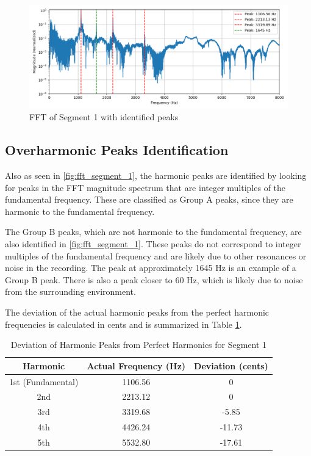 \begin{figure}[H]
    \centering
    \includegraphics[width=\textwidth]{data/fft_spectrums/fft_spectrum_segment_1.png}
    \caption{FFT of Segment 1 with identified peaks}
    \label{fig:fft_segment_1}
\end{figure}

\subsection{Overharmonic Peaks Identification}

Also as seen in \autoref{fig:fft_segment_1}, the harmonic peaks are identified by looking for peaks in the FFT magnitude spectrum that are integer multiples of the fundamental frequency. These are classified as Group A peaks, since they are harmonic to the fundamental frequency. 

The Group B peaks, which are not harmonic to the fundamental frequency, are also identified in \autoref{fig:fft_segment_1}. These peaks do not correspond to integer multiples of the fundamental frequency and are likely due to other resonances or noise in the recording. The peak at approximately 1645 Hz is an example of a Group B peak. There is also a peak closer to 60 Hz, which is likely due to noise from the surrounding environment.

The deviation of the actual harmonic peaks from the perfect harmonic frequencies is calculated in cents and is summarized in Table \ref{tab:deviation_segment_1}. 

\begin{table}[H]
    \centering
    \caption{Deviation of Harmonic Peaks from Perfect Harmonics for Segment 1}
    \begin{tabular}{ccc}
        \hline
        Harmonic & Actual Frequency (Hz) & Deviation (cents) \\
        \hline
        1st (Fundamental) & 1106.56 & 0 \\
        2nd & 2213.12 & 0 \\
        3rd & 3319.68 & -5.85 \\
        4th & 4426.24 & -11.73 \\
        5th & 5532.80 & -17.61 \\
        \hline
    \end{tabular}
    \label{tab:deviation_segment_1}
\end{table}


